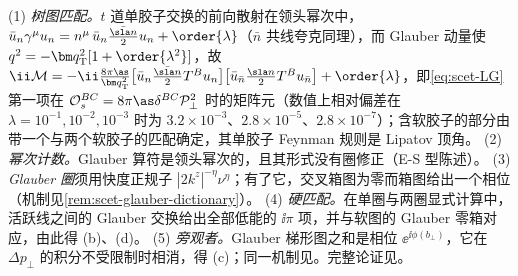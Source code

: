 \begin{proofsketch}
(1) \emph{树图匹配。}$t$ 道单胶子交换的前向散射在领头幂次中，$\bar u_n\gamma^\mu u_n=n^\mu\,\bar u_n\frac{\bar{\sla n}}{2}u_n+\order{\lambda}$（$\bar n$ 共线夸克同理），而 Glauber 动量使 $q^2=-\bm q_{\mathrm T}^2[1+\order{\lambda^2}]$，故
$\ii\mathcal M=-\ii\frac{8\pi\as}{\bm q_{\mathrm T}^2}\big[\bar u_n\tfrac{\bar{\sla n}}{2}T^Bu_n\big]\big[\bar u_{\bar n}\tfrac{\sla n}{2}T^Bu_{\bar n}\big]+\order{\lambda}$，即\cref{eq:scet-LG}第一项在 $\mathcal O_s^{BC}=8\pi\as\delta^{BC}\mathcal P_\perp^2$ 时的矩阵元（数值上相对偏差在 $\lambda=10^{-1},10^{-2},10^{-3}$ 时为 $3.2\times10^{-3}$、$2.8\times10^{-5}$、$2.8\times10^{-7}$）；含软胶子的部分由带一个与两个软胶子的匹配确定，其单胶子 Feynman 规则是 Lipatov 顶角\cite[第~5.1、6~节]{RothsteinStewart2016}。%
(2) \emph{幂次计数。}Glauber 算符是领头幂次的，且其形式没有圈修正\cite[第~5.3~节]{RothsteinStewart2016}（E-S 型陈述）。
(3) \emph{Glauber 圈}须用快度正规子 $|2k^z|^{-\eta}\nu^\eta$；有了它，交叉箱图为零而箱图给出一个相位（机制见\cref{rem:scet-glauber-dictionary}）\cite[第~5.2~节]{RothsteinStewart2016}。
(4) \emph{硬匹配。}在单圈与两圈显式计算中，活跃线之间的 Glauber 交换给出全部低能的 $\ii\pi$ 项，并与软图的 Glauber 零箱对应，由此得 (b)、(d)\cite[第~10~节]{RothsteinStewart2016}。
(5) \emph{旁观者。}Glauber 梯形图之和是相位 $\ee^{\ii\phi(b_\perp)}$，它在 $\Delta p_\perp$ 的积分不受限制时相消，得 (c)\cite[式~(9.1)、(9.18)--(9.19)、(11.12)--(11.13)]{RothsteinStewart2016}；同一机制见\cite[式~(14)]{AybatSterman2009}。完整论证见\cite[第~5、9--11~节]{RothsteinStewart2016}。
\end{proofsketch}

